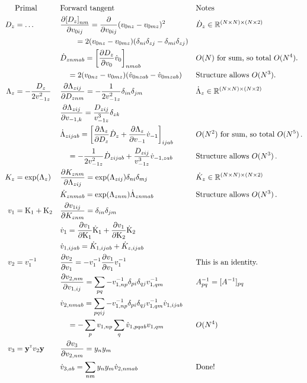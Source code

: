 \begin{align}
&\text{Primal} && \text{Forward tangent} && \text{Notes} \nonumber \\
D_z &= \dots && \pderiv[{[D_z]}_{nm}]{v_{0ij}} = \pderiv{v_{0ij}} (v_{0nz} - v_{0mz})^2 &&  \dot D_z \in \Reals^{(N\times N) \times (N\times 2)}  \nonumber \\
& && \qquad = 2(v_{0nz} - v_{0mz})(\delta_{ni}\delta_{zj} - \delta_{mi}\delta_{zj}) &&\\
& && \dot D_{znmab} = \left[\pderiv[D_z]{v_0} \dot v_0\right]_{nmab} && O(N) \text{ for sum, so total } O(N^4). \\
& && \quad = 2 (v_{0nz} - v_{0mz}) (\dot v_{0nzab} - \dot v_{0mzab})&& \text{Structure allows } O(N^3). \\
\Lambda_z &= - \frac{D_z}{2v_{-1z}^2} && \pderiv[\Lambda_{zij}]{D_{znm}} = - \frac{1}{2v_{-1z}^2}\delta_{in}\delta_{jm}  && \dot \Lambda_z \in \Reals^{(N\times N) \times (N\times 2)} \\
& && \pderiv[\Lambda_{zij}]{v_{-1,k}} = \frac{D_{zij}}{v_{-1z}^3} \delta_{zk} && \\
& && \dot \Lambda_{zijab} = \left[\pderiv[\Lambda_{z}]{D_{z}} \dot D_{z} + \pderiv[\Lambda_{z}]{v_{-1}} \dot v_{-1}\right]_{ijab} && O(N^2)\text{ for sum, so total }O(N^5)\,. \\
& && \quad = - \frac{1}{2v_{-1z}^2} \dot D_{zijab} + \frac{D_{zij}}{v_{-1z}^3} \dot v_{-1,zab} && \text{Structure allows } O(N^3)\,. \\
K_z &= \exp(\Lambda_z) && \pderiv[K_{znm}]{\Lambda_{zij}} = \exp(\Lambda_{zij})\delta_{ni}\delta_{mj} && \dot K_z \in \Reals^{(N\times N)\times (N\times 2)} \\
& && \dot K_{znmab} = \exp(\Lambda_{znm})\dot\Lambda_{znmab} && \text{Structure allows } O(N^3)\,. \\
v_1 &= \mat K_1 + \mat K_2 && \pderiv[v_{1ij}]{K_{znm}} = \delta_{in}\delta_{jm} && \\
& && \dot v_1 = \pderiv[v_1]{\mat K_1} \dot{\mat K}_1 + \pderiv[v_1]{\mat K_2} \dot{\mat K}_2 && \\
& && \dot v_{1,ijab} =  \dot K_{1,ijab} + \dot K_{z,ijab} && \\
v_2&= v_1\inv && \pderiv[v_2]{v_1} = -v_1\inv \pderiv[v_1]{v_1}v_1\inv && \text{This is an identity.} \\
& && \pderiv[v_{2,nm}]{v_{1,ij}} = \sum_{pq}-v_{1,np}\inv \delta_{pi}\delta_{qj} v_{1,qm}\inv && A_{pq}\inv = [A\inv]_{pq} \\
& && \dot v_{2,nmab} = \sum_{pqij} -v_{1,np}\inv \delta_{pi}\delta_{qj} v_{1,qm}\inv \dot v_{1,ijab} && \\
& && \quad = -\sum_{p} v_{1,np} \sum_q \dot v_{1,pqab} v_{1,qm} && O(N^4) \\
v_3 &= \vy\transpose v_2 \vy && \pderiv[v_3]{v_{2,nm}} = y_ny_m  && \\
& &&\dot v_{3,ab} = \sum_{nm} y_ny_m \dot v_{2,nmab} && \text{Done!}
\end{align}

